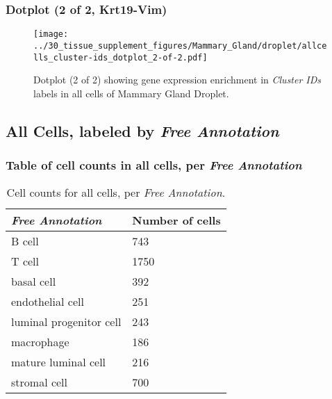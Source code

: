 \clearpage

\subsubsection{Dotplot (2 of 2, Krt19-Vim)}
\begin{figure}[h]
\centering
\texttt{[image: ../30\_tissue\_supplement\_figures/Mammary\_Gland/droplet/allcells\_cluster-ids\_dotplot\_2-of-2.pdf]}

\caption{ Dotplot (2 of 2)  showing gene expression enrichment in \emph{Cluster IDs} labels in all cells of Mammary Gland Droplet. }
\end{figure}


\clearpage

\subsection{All Cells, labeled by \emph{Free Annotation}}
\subsubsection{Table of cell counts in all cells, per \emph{Free Annotation}}\begin{table}[h]
\centering
\label{my-label}
\begin{tabular}{@{}ll@{}}
\toprule

\emph{Free Annotation}& Number of cells \\ \midrule
B cell & 743 \\

T cell & 1750 \\

basal cell & 392 \\

endothelial cell & 251 \\

luminal progenitor cell & 243 \\

macrophage & 186 \\

mature luminal cell & 216 \\

stromal cell & 700 \\
\bottomrule
\end{tabular}
\caption{Cell counts for all cells, per \emph{Free Annotation}.}
\end{table}

\clearpage
